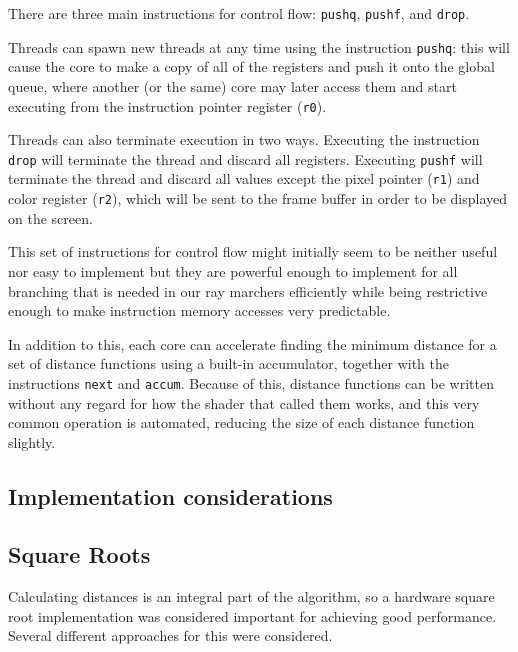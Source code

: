 			There are three main instructions for control flow: \texttt{pushq},
			\texttt{pushf}, and \texttt{drop}. 
			
			Threads can spawn new threads at any time using the instruction
			\texttt{pushq}: this will cause the core to make a copy of all of
			the registers and push it onto the global queue, where another (or
			the same) core may later access them and start executing from the
			instruction pointer register (\texttt{r0}).
			
			Threads can also terminate execution in two ways. Executing the
			instruction \texttt{drop} will terminate the thread and discard all
			registers. Executing \texttt{pushf} will terminate the thread and
			discard all values except the pixel pointer (\texttt{r1}) and color
			register (\texttt{r2}), which will be sent to the frame buffer in
			order to be displayed on the screen.
	
			This set of instructions for control flow might initially seem to
			be neither useful nor easy to implement but they are powerful
			enough to implement for all branching that is needed in our ray
			marchers efficiently while being restrictive enough to make
			instruction memory accesses very predictable.

			In addition to this, each core can accelerate finding the minimum 
			distance for a set of distance functions using a built-in 
			accumulator, together with the instructions \texttt{next} and 
			\texttt{accum}. Because of this, distance functions can be written
			without any regard for how the shader that called them works, and
			this very common operation is automated, reducing the size of each
			distance function slightly.
		
		\subsection{Implementation considerations}			

	
		\subsection{}
		\subsection{Square Roots}
			
			Calculating distances is an integral part of the algorithm, so a
			hardware square root implementation was considered important for 
			achieving good performance. Several different approaches for this 
			were considered.
			
	

